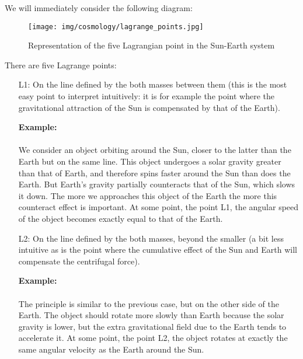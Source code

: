 	We will immediately consider the following diagram:
	\begin{figure}[H]
		\begin{center}
		\texttt{[image: img/cosmology/lagrange\_points.jpg]}
		\caption[]{Representation of the five Lagrangian point in the Sun-Earth system}
		\end{center}	
	\end{figure}
	There are five Lagrange points:
	\begin{enumerate}
		\item[L1:] On the line defined by the both masses between them (this is the most easy point to interpret intuitively: it is for example the point where the gravitational attraction of the Sun is compensated by that of the Earth).

		\begin{tcolorbox}[colframe=black,colback=white,sharp corners]
		\textbf{{\Large {}}Example:}\\\\
		We consider an object orbiting around the Sun, closer to the latter than the Earth but on the same line. This object undergoes a solar gravity greater than that of Earth, and therefore spins faster around the Sun than does the Earth. But Earth's gravity partially counteracts that of the Sun, which slows it down. The more we approaches this object of the Earth the more this counteract effect is important. At some point, the point L1, the angular speed of the object becomes exactly equal to that of the Earth.
		\end{tcolorbox}
		

		\item[L2:] On the line defined by the both masses, beyond the smaller (a bit less intuitive as is the point where the cumulative effect of the Sun and Earth will compensate the centrifugal force).

		\begin{tcolorbox}[colframe=black,colback=white,sharp corners]
		\textbf{{\Large {}}Example:}\\\\
		The principle is similar to the previous case, but on the other side of the Earth. The object should rotate more slowly than Earth because the solar gravity is lower, but the extra gravitational field due to the Earth tends to accelerate it. At some point, the point L2, the object rotates at exactly the same angular velocity as the Earth around the Sun.
		\end{tcolorbox}
		

\end{enumerate}
